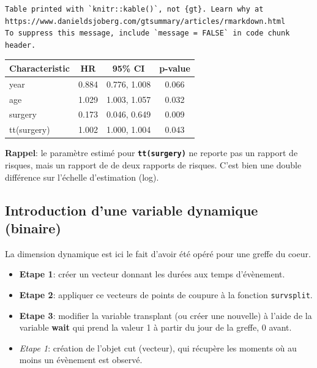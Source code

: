 \documentclass[
  12pt,
  letterpaper,
  DIV=11,
  numbers=noendperiod,
  onepage,
  openany]{scrreprt}
\begin{document}
\begin{verbatim}
Table printed with `knitr::kable()`, not {gt}. Learn why at
https://www.danieldsjoberg.com/gtsummary/articles/rmarkdown.html
To suppress this message, include `message = FALSE` in code chunk header.
\end{verbatim}

\begin{longtable}[]{@{}lccc@{}}
\toprule\noalign{}
\textbf{Characteristic} & \textbf{HR} & \textbf{95\% CI} &
\textbf{p-value} \\
\midrule\noalign{}
\endhead
\bottomrule\noalign{}
\endlastfoot
year & 0.884 & 0.776, 1.008 & 0.066 \\
age & 1.029 & 1.003, 1.057 & 0.032 \\
surgery & 0.173 & 0.046, 0.649 & 0.009 \\
tt(surgery) & 1.002 & 1.000, 1.004 & 0.043 \\
\end{longtable}

\textbf{Rappel}: le paramètre estimé pour \textbf{\texttt{tt(surgery)}}
ne reporte pas un rapport de risques, mais un rapport de de deux
rapports de risques. C'est bien une double différence sur l'échelle
d'estimation (log).

\hypertarget{introduction-dune-variable-dynamique-binaire}{%
\subsection{Introduction d'une variable dynamique
(binaire)}\label{introduction-dune-variable-dynamique-binaire}}

La dimension dynamique est ici le fait d'avoir été opéré pour une greffe
du coeur.

\begin{itemize}
\item
  \textbf{Etape 1}: créer un vecteur donnant les durées aux temps
  d'évènement.
\item
  \textbf{Etape 2}: appliquer ce vecteurs de points de coupure à la
  fonction \texttt{survsplit}.
\item
  \textbf{Etape 3}: modifier la variable transplant (ou créer une
  nouvelle) à l'aide de la variable \textbf{wait} qui prend la valeur 1
  à partir du jour de la greffe, 0 avant.
\item
  \emph{Etape 1}: création de l'objet cut (vecteur), qui récupère les
  moments où au moins un évènement est observé.
\end{itemize}
\end{document}
